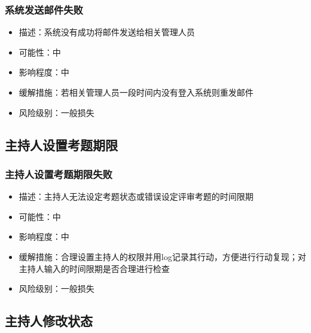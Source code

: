 \documentclass[hyperref, a4paper]{ctexart}
\providecommand{\tightlist}{%
  \setlength{\itemsep}{0pt}\setlength{\parskip}{0pt}}
\begin{document}
\hypertarget{ux7cfbux7edfux53d1ux9001ux90aeux4ef6ux5931ux8d25}{%
\subsubsection{系统发送邮件失败}\label{ux7cfbux7edfux53d1ux9001ux90aeux4ef6ux5931ux8d25}}

\begin{itemize}
\tightlist
\item
  描述：系统没有成功将邮件发送给相关管理人员
\item
  可能性：中
\item
  影响程度：中
\item
  缓解措施：若相关管理人员一段时间内没有登入系统则重发邮件
\item
  风险级别：一般损失
\end{itemize}

\hypertarget{ux4e3bux6301ux4ebaux8bbeux7f6eux8003ux9898ux671fux9650-1}{%
\subsection{主持人设置考题期限}\label{ux4e3bux6301ux4ebaux8bbeux7f6eux8003ux9898ux671fux9650-1}}

\hypertarget{ux4e3bux6301ux4ebaux8bbeux7f6eux8003ux9898ux671fux9650ux5931ux8d25}{%
\subsubsection{主持人设置考题期限失败}\label{ux4e3bux6301ux4ebaux8bbeux7f6eux8003ux9898ux671fux9650ux5931ux8d25}}

\begin{itemize}
\tightlist
\item
  描述：主持人无法设定考题状态或错误设定评审考题的时间限期
\item
  可能性：中
\item
  影响程度：中
\item
  缓解措施：合理设置主持人的权限并用log记录其行动，方便进行行动复现；对主持人输入的时间限期是否合理进行检查
\item
  风险级别：一般损失
\end{itemize}

\hypertarget{ux4e3bux6301ux4ebaux4feeux6539ux72b6ux6001}{%
\subsection{主持人修改状态}\label{ux4e3bux6301ux4ebaux4feeux6539ux72b6ux6001}}
\end{document}
